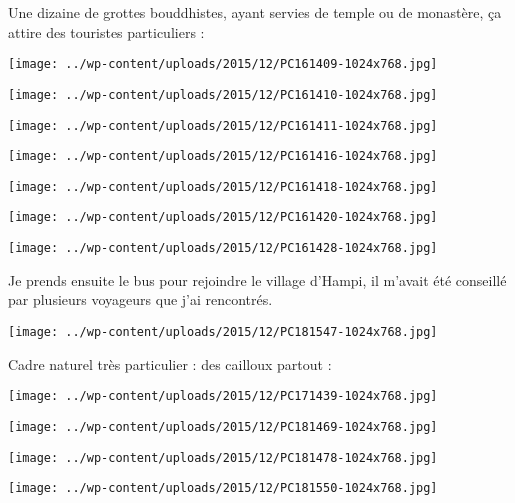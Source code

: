 Une dizaine de grottes bouddhistes, ayant servies de temple ou de monastère, ça attire des touristes particuliers : 
\begin{center} \texttt{[image: ../wp-content/uploads/2015/12/PC161409-1024x768.jpg]} \end{center}
\begin{center} \texttt{[image: ../wp-content/uploads/2015/12/PC161410-1024x768.jpg]} \end{center}
\begin{center} \texttt{[image: ../wp-content/uploads/2015/12/PC161411-1024x768.jpg]} \end{center}
\begin{center} \texttt{[image: ../wp-content/uploads/2015/12/PC161416-1024x768.jpg]} \end{center}
\begin{center} \texttt{[image: ../wp-content/uploads/2015/12/PC161418-1024x768.jpg]} \end{center}
\begin{center} \texttt{[image: ../wp-content/uploads/2015/12/PC161420-1024x768.jpg]} \end{center}
\begin{center} \texttt{[image: ../wp-content/uploads/2015/12/PC161428-1024x768.jpg]} \end{center}
\pagebreak


Je prends ensuite le bus pour rejoindre le village d'Hampi, il m'avait été conseillé par plusieurs voyageurs que j'ai rencontrés. 
\begin{center} \texttt{[image: ../wp-content/uploads/2015/12/PC181547-1024x768.jpg]} \end{center}

Cadre naturel très particulier : des cailloux partout : 
\begin{center} \texttt{[image: ../wp-content/uploads/2015/12/PC171439-1024x768.jpg]} \end{center}
\begin{center} \texttt{[image: ../wp-content/uploads/2015/12/PC181469-1024x768.jpg]} \end{center}
\begin{center} \texttt{[image: ../wp-content/uploads/2015/12/PC181478-1024x768.jpg]} \end{center}
\begin{center} \texttt{[image: ../wp-content/uploads/2015/12/PC181550-1024x768.jpg]} \end{center}

